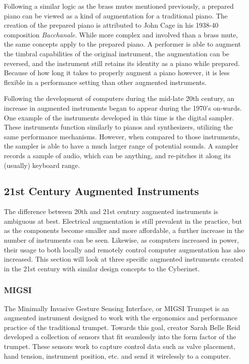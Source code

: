 Following a similar logic as the brass mutes mentioned previously, a prepared piano can be viewed as a kind of augmentation for a traditional piano. The creation of the prepared piano is attributed to John Cage in his 1938-40 composition \textit{Bacchanale}. While more complex and involved than a brass mute, the same concepts apply to the prepared piano. A performer is able to augment the timbral capabilities of the original instrument, the augmentation can be reversed, and the instrument still retains its identity as a piano while prepared. Because of how long it takes to properly augment a piano however, it is less flexible in a performance setting than other augmented instruments.

Following the development of computers during the mid-late 20th century, an increase in augmented instruments began to appear during the 1970's on-wards. One example of the instruments developed in this time is the digital sampler. These instruments function similarly to pianos and synthesizers, utilizing the same performance mechanisms. However, when compared to those instruments, the sampler is able to have a much larger range of potential sounds. A sampler records a sample of audio, which can be anything, and re-pitches it along its (usually) keyboard range. 

\subsection{21st Century Augmented Instruments}
The difference between 20th and 21st century augmented instruments is ambiguous at best. Electrical augmentation is still prevalent in the practice, but as the components become smaller and more affordable, a further increase in the number of instruments can be seen. %
Likewise, as computers increased in power, their usage to both locally and remotely control computer augmentation has also increased. This section will look at three specific augmented instruments created in the 21st century with similar design concepts to the Cyberinet.

\subsubsection{MIGSI}

The Minimally Invasive Gesture Sensing Interface, or MIGSI Trumpet is an augmented instrument designed to work with the ergonomics and performance practice of the traditional trumpet\cite{reid2016}. Towards this goal, creator Sarah Belle Reid developed a collection of sensors that fit seamlessly into the form factor of the trumpet. These sensors work to capture control data such as valve placement, hand tension, instrument position, etc. and send it wirelessly to a computer.

